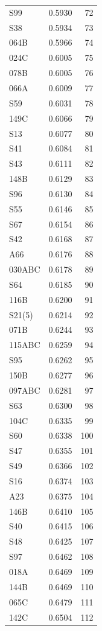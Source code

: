 \begin{longtable}{lrr}
  S99 & 0.5930 & 72 \\
  S38 & 0.5934 & 73 \\
  064B & 0.5966 & 74 \\
  024C & 0.6005 & 75 \\
  078B & 0.6005 & 76 \\
  066A & 0.6009 & 77 \\
  S59 & 0.6031 & 78 \\
  149C & 0.6066 & 79 \\
  S13 & 0.6077 & 80 \\
  S41 & 0.6084 & 81 \\
  S43 & 0.6111 & 82 \\
  148B & 0.6129 & 83 \\
  S96 & 0.6130 & 84 \\
  S55 & 0.6146 & 85 \\
  S67 & 0.6154 & 86 \\
  S42 & 0.6168 & 87 \\
  A66 & 0.6176 & 88 \\
  030ABC & 0.6178 & 89 \\
  S64 & 0.6185 & 90 \\
  116B & 0.6200 & 91 \\
  S21(5) & 0.6214 & 92 \\
  071B & 0.6244 & 93 \\
  115ABC & 0.6259 & 94 \\
  S95 & 0.6262 & 95 \\
  150B & 0.6277 & 96 \\
  097ABC & 0.6281 & 97 \\
  S63 & 0.6300 & 98 \\
  104C & 0.6335 & 99 \\
  S60 & 0.6338 & 100 \\
  S47 & 0.6355 & 101 \\
  S49 & 0.6366 & 102 \\
  S16 & 0.6374 & 103 \\
  A23 & 0.6375 & 104 \\
  146B & 0.6410 & 105 \\
  S40 & 0.6415 & 106 \\
  S48 & 0.6425 & 107 \\
  S97 & 0.6462 & 108 \\
  018A & 0.6469 & 109 \\
  144B & 0.6469 & 110 \\
  065C & 0.6479 & 111 \\
  142C & 0.6504 & 112 \\

\end{longtable}
